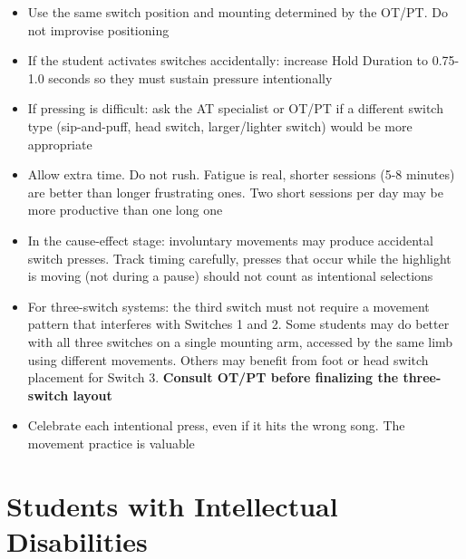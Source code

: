 \documentclass[justified,openright]{tufte-book}
\begin{document}
\begin{itemize}

\item
  Use the same switch position and mounting determined by the OT/PT. Do
  not improvise positioning
\item
  If the student activates switches accidentally: increase Hold Duration
  to 0.75-1.0 seconds so they must sustain pressure intentionally
\item
  If pressing is difficult: ask the AT specialist or OT/PT if a
  different switch type (sip-and-puff, head switch, larger/lighter
  switch) would be more appropriate
\item
  Allow extra time. Do not rush. Fatigue is real, shorter sessions
  (5-8 minutes) are better than longer frustrating ones. Two short
  sessions per day may be more productive than one long one
\item
  In the cause-effect stage: involuntary movements may produce
  accidental switch presses. Track timing carefully, presses that
  occur while the highlight is moving (not during a pause) should not
  count as intentional selections
\item
  For three-switch systems: the third switch must not require a movement
  pattern that interferes with Switches 1 and 2. Some students may do
  better with all three switches on a single mounting arm, accessed by
  the same limb using different movements. Others may benefit from foot
  or head switch placement for Switch 3. \textbf{Consult OT/PT before
  finalizing the three-switch layout}
\item
  Celebrate each intentional press, even if it hits the wrong song. The
  movement practice is valuable
\end{itemize}

\section{Students with Intellectual
Disabilities}\label{students-with-intellectual-disabilities}

\end{document}
